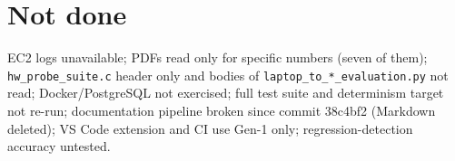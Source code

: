 \section{Not done}
EC2 logs unavailable; PDFs read only for specific numbers (seven of them); \texttt{hw\_probe\_suite.c} header only and bodies of \texttt{laptop\_to\_*\_evaluation.py} not read; Docker/PostgreSQL not exercised; full test suite and determinism target not re-run; documentation pipeline broken since commit 38c4bf2 (Markdown deleted); VS Code extension and CI use Gen-1 only; regression-detection accuracy untested.

